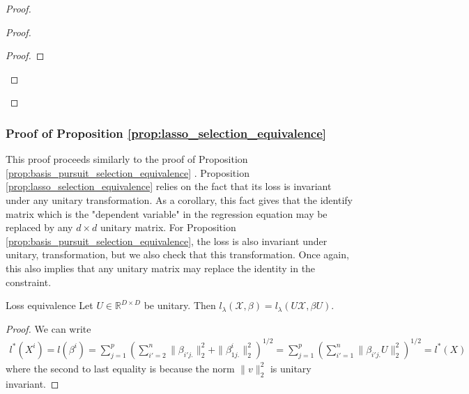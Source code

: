 \begin{proof}
\begin{proof}
\begin{proof}


\end{proof}
\end{proof}

\end{proof}
\subsubsection{Proof of Proposition \ref{prop:lasso_selection_equivalence} }

This proof proceeds similarly to the proof of Proposition  \ref{prop:basis_pursuit_selection_equivalence} .
Proposition \ref{prop:lasso_selection_equivalence} relies on the fact that its loss is invariant under any unitary transformation.
As a corollary, this fact gives that the identify matrix which is the "dependent variable" in the regression equation may be replaced by any $d \times d$ unitary matrix.
For Proposition \ref{prop:basis_pursuit_selection_equivalence}, the loss is also invariant under unitary, transformation, but we also check that this transformation.
Once again, this also implies that any unitary matrix may replace the identity in the constraint.

 \begin{proposition}{Loss equivalence}
 \label{prop:lasso_loss_equivalence}
 Let $U \in \mathbb R^{D \times D}$ be unitary.
 Then $l_\lambda (\mathcal X, \beta) = l_\lambda (U \mathcal X, \beta U)$.
\end{proposition}

\begin{proof}
We can write 
\begin{eqnarray}
l^*(X^i) = l(\beta^i) = \sum_{j = 1}^p (\sum_{i'=2}^n \| \beta_{i'j.} \|_2^2 +  \|  \beta_{1j.}^i \|_2^2 )^{1/2}=  \sum_{j = 1}^p (\sum_{i'=1}^n \| \beta_{i'j.} U \|_2^2)^{1/2} = l^*(X)
\end{eqnarray}
where the second to last equality is because the norm $\|v\|_2^2 $ is unitary invariant.

\end{proof}

